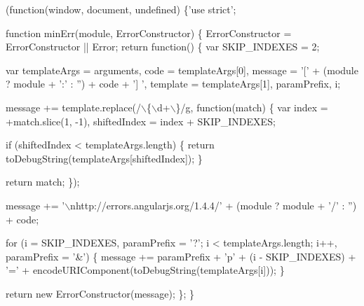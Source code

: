 \begin{DoxyCodeInclude}

(\textcolor{keyword}{function}(window, document, undefined) \{\textcolor{stringliteral}{'use strict'};

\textcolor{keyword}{function} minErr(module, ErrorConstructor) \{
  ErrorConstructor = ErrorConstructor || Error;
  \textcolor{keywordflow}{return} \textcolor{keyword}{function}() \{
    var SKIP\_INDEXES = 2;

    var templateArgs = arguments,
      code = templateArgs[0],
      message = \textcolor{charliteral}{'['} + (module ? module + \textcolor{charliteral}{':'} : \textcolor{stringliteral}{''}) + code + \textcolor{stringliteral}{'] '},
      \textcolor{keyword}{template} = templateArgs[1],
      paramPrefix, i;

    message += \textcolor{keyword}{template}.replace(/\(\backslash\)\{\(\backslash\)d+\(\backslash\)\}/g, \textcolor{keyword}{function}(match) \{
      var index = +match.slice(1, -1),
        shiftedIndex = index + SKIP\_INDEXES;

      \textcolor{keywordflow}{if} (shiftedIndex < templateArgs.length) \{
        \textcolor{keywordflow}{return} toDebugString(templateArgs[shiftedIndex]);
      \}

      \textcolor{keywordflow}{return} match;
    \});

    message += \textcolor{stringliteral}{'\(\backslash\)nhttp://errors.angularjs.org/1.4.4/'} +
      (module ? module + \textcolor{charliteral}{'/'} : \textcolor{stringliteral}{''}) + code;

    \textcolor{keywordflow}{for} (i = SKIP\_INDEXES, paramPrefix = \textcolor{charliteral}{'?'}; i < templateArgs.length; i++, paramPrefix = \textcolor{charliteral}{'&'}) \{
      message += paramPrefix + \textcolor{charliteral}{'p'} + (i - SKIP\_INDEXES) + \textcolor{charliteral}{'='} +
        encodeURIComponent(toDebugString(templateArgs[i]));
    \}

    \textcolor{keywordflow}{return} \textcolor{keyword}{new} ErrorConstructor(message);
  \};
\}


\end{DoxyCodeInclude}
